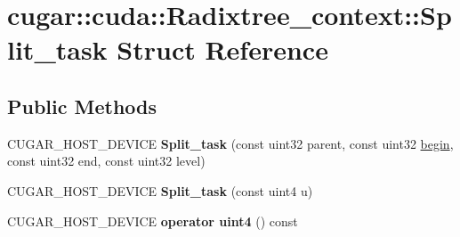 \hypertarget{structcugar_1_1cuda_1_1_radixtree__context_1_1_split__task}{}\section{cugar\+:\+:cuda\+:\+:Radixtree\+\_\+context\+:\+:Split\+\_\+task Struct Reference}
\label{structcugar_1_1cuda_1_1_radixtree__context_1_1_split__task}
\subsection*{Public Methods}
\begin{DoxyCompactItemize}
\item 
\mbox{\label{structcugar_1_1cuda_1_1_radixtree__context_1_1_split__task_a458fc32f4b466eb2f6db6b1795284511}} 
C\+U\+G\+A\+R\+\_\+\+H\+O\+S\+T\+\_\+\+D\+E\+V\+I\+CE {\bfseries Split\+\_\+task} (const uint32 parent, const uint32 \hyperlink{namespacecugar_a2121df08f967e232ea5fe0ee378dee67}{begin}, const uint32 end, const uint32 level)
\item 
\mbox{\label{structcugar_1_1cuda_1_1_radixtree__context_1_1_split__task_a8b039235c5f961b3422e5a663a1adc2a}} 
C\+U\+G\+A\+R\+\_\+\+H\+O\+S\+T\+\_\+\+D\+E\+V\+I\+CE {\bfseries Split\+\_\+task} (const uint4 u)
\item 
\mbox{\label{structcugar_1_1cuda_1_1_radixtree__context_1_1_split__task_ab2f62150f360854f702a5e05080ed84f}} 
C\+U\+G\+A\+R\+\_\+\+H\+O\+S\+T\+\_\+\+D\+E\+V\+I\+CE {\bfseries operator uint4} () const
\end{DoxyCompactItemize}
